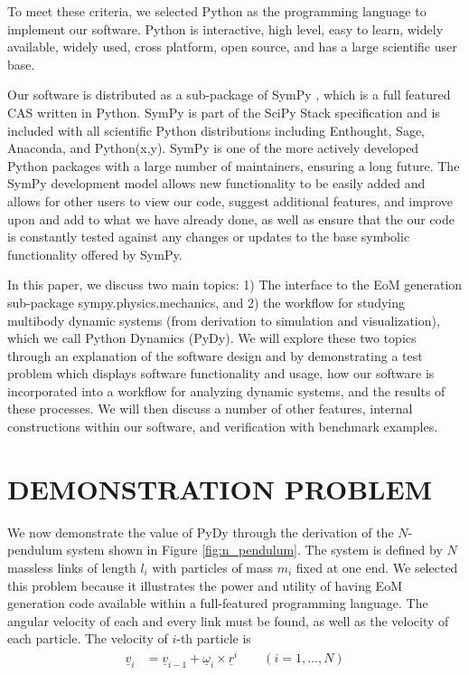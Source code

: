 \documentclass[twocolumn,10pt]{asme2e}
\begin{document}
To meet these criteria, we selected Python as the programming language to
implement our software. Python is interactive, high level, easy to learn,
widely available, widely used, cross platform, open source, and has a large
scientific user base.

Our software is distributed as a sub-package of SymPy \cite{sympy2012}, which
is a full featured CAS written in Python. SymPy is part of the SciPy Stack
\cite{SciPyStackGithub} specification and is included with all scientific
Python distributions including Enthought, Sage, Anaconda, and Python(x,y).
SymPy is one of the more actively developed Python packages with a large number
of maintainers, ensuring a long future. The SymPy development model allows new
functionality to be easily added and allows for other users to view our code,
suggest additional features, and improve upon and add to what we have already
done, as well as ensure that the our code is constantly tested against any
changes or updates to the base symbolic functionality offered by SymPy.

In this paper, we discuss two main topics: 1) The interface to the EoM
generation sub-package sympy.physics.mechanics, and 2) the workflow for
studying multibody dynamic systems (from derivation to simulation and
visualization), which we call Python Dynamics (PyDy). We will explore these two
topics through an explanation of the software design and by demonstrating a
test problem which displays software functionality and usage, how our software
is incorporated into a workflow for analyzing dynamic systems, and the results
of these processes. We will then discuss a number of other features, internal
constructions within our software, and verification with benchmark examples.

\section*{DEMONSTRATION PROBLEM}
We now demonstrate the value of PyDy through the derivation of the $N$-pendulum
system shown in Figure \ref{fig:n_pendulum}.  The system is defined by $N$
massless links of length $l_i$ with particles of mass $m_i$ fixed at one end.
We selected this problem because it illustrates the power and utility of having
EoM generation code available within a full-featured programming language. The
angular velocity of each and every link must be found, as well as the velocity
of each particle. The velocity of $i$-th particle is
\begin{align*}
  \underline{v}_i &= \underline{v}_{i-1} + \underline{\omega}_i \times
  \underline{r}^i \qquad (i = 1,\dots,N)
\end{align*}
\end{document}
